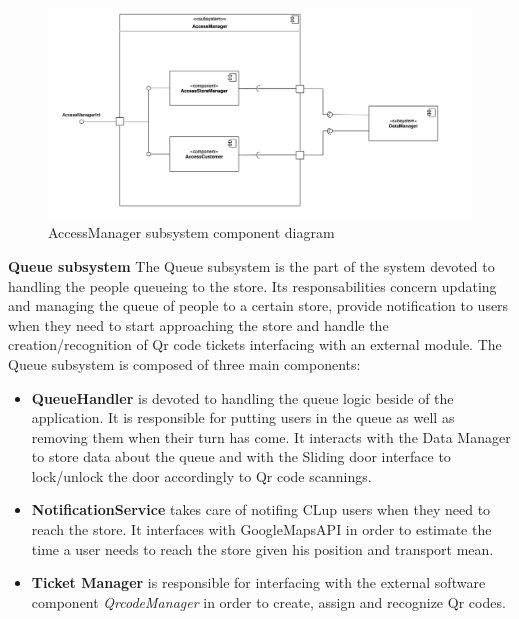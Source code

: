 \documentclass[]{article}
\begin{document}
	\begin{figure}[H]
			\centering
			\includegraphics[scale=0.6]{ComponentView/AccessManagerComponent.png}
			\caption{AccessManager subsystem component diagram}
			\label{fig:AccessManagerDiagram}
		\end{figure}
		\bigskip\bigskip
	
	
	\textbf{Queue subsystem} \newline
	The Queue subsystem is the part of the system devoted to handling the people queueing to the store.
	Its responsabilities concern updating and managing the queue of people to a certain store, provide notification to users when they need to start approaching the store and handle the creation/recognition of Qr code tickets interfacing with an external module.
	The Queue subsystem is composed of three main components:
	
	\begin{itemize}
		\item 	\textbf{QueueHandler} is devoted to handling the queue logic beside of the application. It is responsible for putting users in the queue as well as removing them when their turn has come. It interacts with the Data Manager to store data about the queue and with the Sliding door interface to lock/unlock the door accordingly to Qr code scannings.
		
		\item 	\textbf{NotificationService} takes care of notifing CLup users when they need to reach the store. It interfaces with GoogleMapsAPI in order to estimate the time a user needs to reach the store given his position and transport mean.
		
		\item 	\textbf{Ticket Manager} is responsible for interfacing with the external software component \textit{QrcodeManager} in order to create, assign and recognize Qr codes.
		
	
	\end{itemize}
\end{document}
